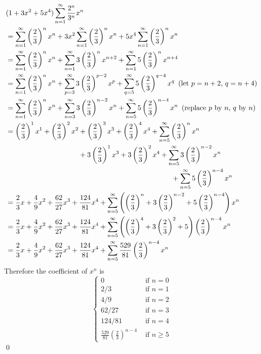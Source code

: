 \newcommand\sdfs{\left(\frac{2}{3}\right)} %
\begin{align*}
&(1 + 3x^2 + 5x^4) \sum_{n = 1}^\infty \frac{2^n}{3^n}x^n \\
&= \sum_{n = 1}^\infty \sdfs^n x^n
+ 3x^2 \sum_{n = 1}^\infty \sdfs^n x^n
+ 5x^4 \sum_{n = 1}^\infty \sdfs^n x^n
\\
 &= \sum_{n = 1}^\infty \sdfs^n x^n
 + \sum_{n = 1}^\infty 3 \sdfs^n x^{n+2}
 + \sum_{n = 1}^\infty 5 \sdfs^n x^{n+4}
 \\
 &= \sum_{n = 1}^\infty \sdfs^n x^n
 + \sum_{p = 3}^\infty 3 \sdfs^{p-2} x^{p}
 + \sum_{q = 5}^\infty 5 \sdfs^{q-4} x^{q} \,\,\,\text{(let $p=n+2$, $q=n+4$)}
 \\
&= \sum_{n = 1}^\infty \sdfs^n x^n
+ \sum_{n = 3}^\infty 3 \sdfs^{n-2} x^{n}
+ \sum_{n = 5}^\infty 5 \sdfs^{n-4} x^{n} \,\,\,\text{(replace $p$ by $n$, $q$ by $n$)}
\\
&=
\sdfs^1 x^1 + \sdfs^2 x^2 + \sdfs^3 x^3 + \sdfs^4 x^4 + \sum_{n = 5}^\infty \sdfs^n x^n \\
&\hspace{3.6cm} + 3 \sdfs^{1} x^{3} + 3 \sdfs^{2} x^{4} + \sum_{n = 5}^\infty 3 \sdfs^{n-2} x^{n} \\
&\hspace{8.2cm} + \sum_{n = 5}^\infty 5 \sdfs^{n-4} x^{n}
\\
 &=
 \frac{2}{3} x
 + \frac{4}{9} x^2
 + \frac{62}{27}x^3
 + \frac{124}{81}x^4
 + \sum_{n = 5}^\infty
 \left(
 \sdfs^n
 + 3 \sdfs^{n-2}
 + 5 \sdfs^{n-4} 
 \right) x^n
 \\
 &=
 \frac{2}{3} x
 + \frac{4}{9} x^2
 + \frac{62}{27}x^3
 + \frac{124}{81}x^4
 + \sum_{n = 5}^\infty
 \left(
 \sdfs^4 + 3 \sdfs^2 + 5
 \right) \sdfs^{n-4} x^n
 \\
 &=
 \frac{2}{3} x + \frac{4}{9} x^2 + \frac{62}{27}x^3 + \frac{124}{81}x^4
 +\sum_{n = 5}^\infty
 \frac{529}{81}
 \sdfs^{n-4} x^n
\end{align*}
Therefore the coefficient of $x^n$ is
\[
\begin{cases}
 0 & \text{ if } n = 0 \\
 2/3 & \text{ if } n = 1 \\
 4/9 & \text{ if } n = 2 \\
 62/27 & \text{ if } n = 3 \\
 124/81 & \text{ if } n = 4 \\
\displaystyle\frac{529}{81}\sdfs^{n-4}  & \text{ if } n \geq 5 
\end{cases}
\]
\qed

